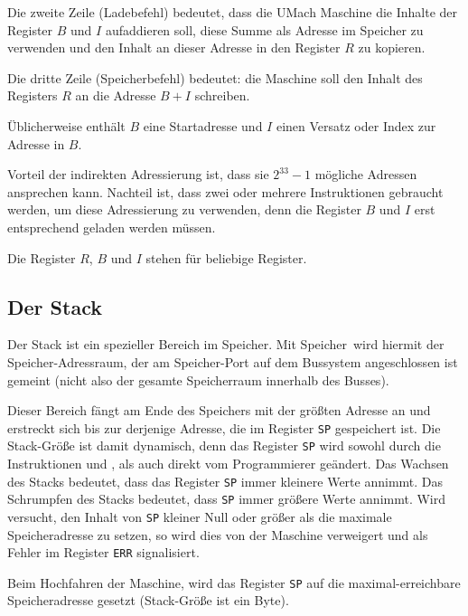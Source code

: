 Die zweite Zeile (Ladebefehl) bedeutet, dass die UMach Maschine die Inhalte der
Register $B$ und $I$ aufaddieren soll, diese Summe als Adresse im
Speicher zu verwenden und den Inhalt an dieser Adresse in den Register $R$ zu
kopieren.

Die dritte Zeile (Speicherbefehl) bedeutet: die Maschine soll den Inhalt des
Registers $R$ an die Adresse $B + I$ schreiben.

Üblicherweise enthält $B$ eine Startadresse und $I$ einen Versatz oder Index zur
Adresse in $B$.

Vorteil der indirekten Adressierung ist, dass sie $2^{33} - 1$ mögliche Adressen
ansprechen kann. Nachteil ist, dass zwei oder mehrere Instruktionen gebraucht
werden, um diese Adressierung zu verwenden, denn die Register $B$ und $I$ erst
entsprechend geladen werden müssen.

Die Register $R$, $B$ und $I$ stehen für beliebige Register.



\subsection{Der Stack}
\label{subsec:Stack}

Der Stack ist ein spezieller Bereich im Speicher. Mit \glqq Speicher\grqq\ wird
hiermit der Speicher-Adressraum, der am Speicher-Port auf dem Bussystem
angeschlossen ist gemeint (nicht also der gesamte Speicherraum innerhalb des Busses).

Dieser Bereich fängt am Ende des Speichers mit der größten Adresse an und
erstreckt sich bis zur derjenige Adresse, die im Register \texttt{SP}
gespeichert ist. Die Stack-Größe ist damit dynamisch, denn das Register
\texttt{SP} wird sowohl durch die Instruktionen  und  , als
auch direkt vom Programmierer geändert.
Das Wachsen
des Stacks bedeutet, dass das Register \texttt{SP} immer kleinere Werte annimmt.
Das Schrumpfen
des Stacks bedeutet, dass \texttt{SP} immer größere Werte annimmt. 
Wird versucht, den Inhalt von \texttt{SP} kleiner Null oder größer als die
maximale Speicheradresse zu setzen, so wird dies von der Maschine verweigert und
als Fehler im Register \texttt{ERR} signalisiert.

Beim Hochfahren der Maschine, wird das Register \texttt{SP} auf die
maximal-erreichbare Speicheradresse gesetzt (Stack-Größe ist ein Byte).


